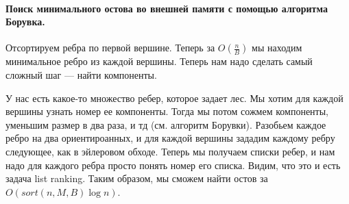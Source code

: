 \documentclass[12pt]{article}
\begin{document}
\paragraph{Поиск минимального остова во внешней памяти с помощью алгоритма Борувка.} Отсортируем ребра по первой вершине. Теперь за $O(\frac{n}{B})$ мы находим минимальное ребро из каждой вершины. Теперь нам надо сделать самый сложный шаг --- найти компоненты.

У нас есть какое-то множество ребер, которое задает лес. Мы хотим для каждой вершины узнать номер ее компоненты. Тогда мы потом сожмем компоненты, уменьшим размер в два раза, и тд (см. алгоритм Борувки). Разобьем каждое ребро на два ориентироанных, и для каждой вершины зададим каждому ребру следующее, как в эйлеровом обходе. Теперь мы получаем списки ребер, и нам надо для каждого ребра просто понять номер его списка. Видим, что это и есть задача list ranking. Таким образом, мы сможем найти остов за $O(sort(n, M, B) \log n)$.
\end{document}
